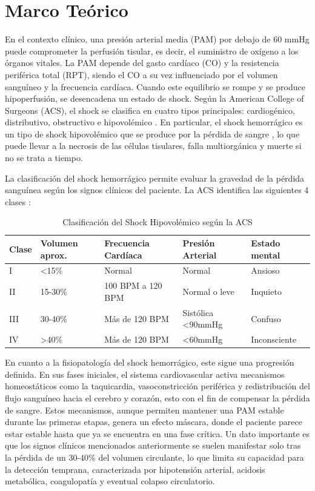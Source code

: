 \section{Marco Teórico}

En el contexto clínico, una presión arterial media (PAM) por debajo de 60 mmHg puede comprometer la perfusión tisular, es decir, el suministro de oxígeno a los órganos vitales. La PAM depende del gasto cardíaco (CO) y la resistencia periférica total (RPT), siendo el CO a su vez influenciado por el volumen sanguíneo y la frecuencia cardíaca. Cuando este equilibrio se rompe y se produce hipoperfusión, se desencadena un estado de shock. Según la American College of Surgeons (ACS), el shock se clasifica en cuatro tipos principales: cardiogénico, distributivo, obstructivo e hipovolémico \cite{hooper2022}. En particular, el shock hemorrágico es un tipo de shock hipovolémico que se produce por la pérdida de sangre \cite{cannon2018}, lo que puede llevar a la necrosis de las células tisulares, falla multiorgánica y muerte si no se trata a tiempo.

La clasificación del shock hemorrágico permite evaluar la gravedad de la pérdida sanguínea según los signos clínicos del paciente. La ACS identifica las siguientes 4 clases \cite{hooper2022}:

\begin{table}[H]
\centering
\caption{Clasificación del Shock Hipovolémico según la ACS}
\label{tab:clasificacion-shock}
\begin{tabular}{|l|l|l|l|l|}
\hline
\textbf{Clase} & \textbf{Volumen aprox.} & \textbf{Frecuencia Cardíaca} & \textbf{Presión Arterial} & \textbf{Estado mental} \\ \hline
I & <15\% & Normal & Normal & Ansioso \\ \hline
II & 15-30\% & 100 BPM a 120 BPM & Normal o leve & Inquieto \\ \hline
III & 30-40\% & Más de 120 BPM & Sistólica <90mmHg & Confuso \\ \hline
IV & >40\% & Más de 120 BPM & <60mmHg & Inconsciente \\ \hline
\end{tabular}
\end{table}

En cuanto a la fisiopatología del shock hemorrágico, este sigue una progresión definida. En sus fases iniciales, el sistema cardiovascular activa mecanismos homeostáticos como la taquicardia, vasoconstricción periférica y redistribución del flujo sanguíneo hacia el cerebro y corazón, esto con el fin de compensar la pérdida de sangre. Estos mecanismos, aunque permiten mantener una PAM estable durante las primeras etapas, genera un efecto máscara, donde el paciente parece estar estable hasta que ya se encuentra en una fase crítica. Un dato importante es que los signos clínicos mencionados anteriormente se suelen manifestar solo tras la pérdida de un 30-40\% del volumen circulante, lo que limita su capacidad para la detección temprana, caracterizada por hipotensión arterial, acidosis metabólica, coagulopatía y eventual colapso circulatorio.

